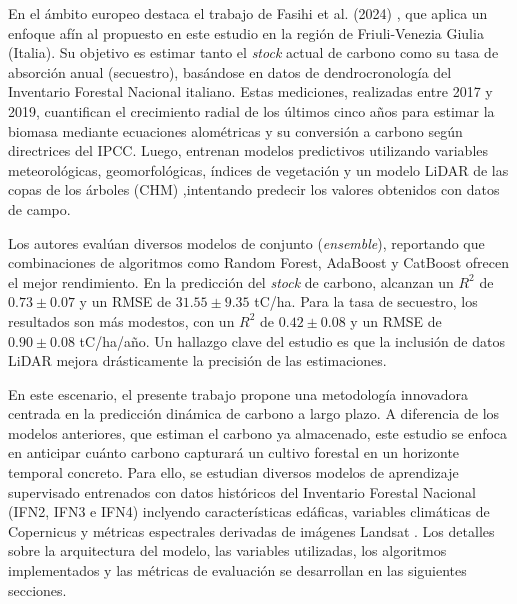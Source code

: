 En el ámbito europeo destaca el trabajo de Fasihi et al. (2024) \cite{fasihi2024assessing}, que aplica un enfoque afín al propuesto en este estudio en la región de Friuli-Venezia Giulia (Italia). Su objetivo es estimar tanto el \textit{stock} actual de carbono como su tasa de absorción anual (secuestro), basándose en datos de dendrocronología del Inventario Forestal Nacional italiano. Estas mediciones, realizadas entre 2017 y 2019, cuantifican el crecimiento radial de los últimos cinco años para estimar la biomasa mediante ecuaciones alométricas y su conversión a carbono según directrices del IPCC. Luego, entrenan modelos predictivos utilizando variables meteorológicas, geomorfológicas, índices de vegetación y un modelo LiDAR de las copas de los árboles (CHM) ,intentando predecir los valores obtenidos con datos de campo.

Los autores evalúan diversos modelos de conjunto (\textit{ensemble}), reportando que combinaciones de algoritmos como Random Forest, AdaBoost y CatBoost ofrecen el mejor rendimiento. En la predicción del \textit{stock} de carbono, alcanzan un $R^2$ de $0.73 \pm 0.07$ y un RMSE de $31.55 \pm 9.35$ tC/ha. Para la tasa de secuestro, los resultados son más modestos, con un $R^2$ de $0.42 \pm 0.08$ y un RMSE de $0.90 \pm 0.08$ tC/ha/año. Un hallazgo clave del estudio es que la inclusión de datos LiDAR mejora drásticamente la precisión de las estimaciones.




En este escenario, el presente trabajo propone una metodología innovadora centrada en la predicción dinámica de carbono a largo plazo. A diferencia de los modelos anteriores, que estiman el carbono ya almacenado, este estudio se enfoca en anticipar cuánto carbono capturará un cultivo forestal en un horizonte temporal concreto. Para ello, se estudian diversos modelos de aprendizaje supervisado entrenados con datos históricos del Inventario Forestal Nacional (IFN2, IFN3 e IFN4) \cite{ifn} inclyendo características edáficas, variables climáticas de Copernicus \cite{copernicus_temps,copernicus_pr} y métricas espectrales derivadas de imágenes Landsat \cite{landsat5_data}. Los detalles sobre la arquitectura del modelo, las variables utilizadas, los algoritmos implementados y las métricas de evaluación se desarrollan en las siguientes secciones.




